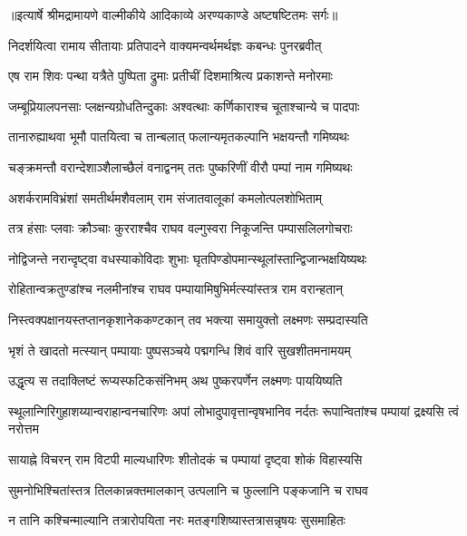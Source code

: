 {॥इत्यार्षे श्रीमद्रामायणे वाल्मीकीये आदिकाव्ये अरण्यकाण्डे अष्टषष्टितमः सर्गः॥}


\twolineshloka
{निदर्शयित्वा रामाय सीतायाः प्रतिपादने}
{वाक्यमन्वर्थमर्थज्ञः कबन्धः पुनरब्रवीत्} %

\twolineshloka
{एष राम शिवः पन्था यत्रैते पुष्पिता द्रुमाः}
{प्रतीचीं दिशमाश्रित्य प्रकाशन्ते मनोरमाः} %

\twolineshloka
{जम्बूप्रियालपनसाः प्लक्षन्यग्रोधतिन्दुकाः}
{अश्वत्थाः कर्णिकाराश्च चूताश्चान्ये च पादपाः} %

\twolineshloka
{तानारुह्याथवा भूमौ पातयित्वा च तान्बलात्}
{फलान्यमृतकल्पानि भक्षयन्तौ गमिष्यथः} %

\twolineshloka
{चङ्क्रमन्तौ वरान्देशाञ्शैलाच्छैलं वनाद्वनम्}
{ततः पुष्करिणीं वीरौ पम्पां नाम गमिष्यथः} %

\twolineshloka
{अशर्करामविभ्रंशां समतीर्थमशैवलाम्}
{राम संजातवालूकां कमलोत्पलशोभिताम्} %

\twolineshloka
{तत्र हंसाः प्लवाः क्रौञ्चाः कुरराश्चैव राघव}
{वल्गुस्वरा निकूजन्ति पम्पासलिलगोचराः} %

\twolineshloka
{नोद्विजन्ते नरान्दृष्ट्वा वधस्याकोविदाः शुभाः}
{घृतपिण्डोपमान्स्थूलांस्तान्द्विजान्भक्षयिष्यथः} %

\twolineshloka
{रोहितान्वक्रतुण्डांश्च नलमीनांश्च राघव}
{पम्पायामिषुभिर्मत्स्यांस्तत्र राम वरान्हतान्} %

\twolineshloka
{निस्त्वक्पक्षानयस्तप्तानकृशानेककण्टकान्}
{तव भक्त्या समायुक्तो लक्ष्मणः सम्प्रदास्यति} %

\twolineshloka
{भृशं ते खादतो मत्स्यान् पम्पायाः पुष्पसञ्चये}
{पद्मगन्धि शिवं वारि सुखशीतमनामयम्} %

\twolineshloka
{उद्धृत्य स तदाक्लिष्टं रूप्यस्फटिकसंनिभम्}
{अथ पुष्करपर्णेन लक्ष्मणः पाययिष्यति} %

\threelineshloka
{स्थूलान्गिरिगुहाशय्यान्वराहान्वनचारिणः}
{अपां लोभादुपावृत्तान्वृषभानिव नर्दतः}
{रूपान्वितांश्च पम्पायां द्रक्ष्यसि त्वं नरोत्तम} %

\twolineshloka
{सायाह्ने विचरन् राम विटपी माल्यधारिणः}
{शीतोदकं च पम्पायां दृष्ट्वा शोकं विहास्यसि} %

\twolineshloka
{सुमनोभिश्चितांस्तत्र तिलकान्नक्तमालकान्}
{उत्पलानि च फुल्लानि पङ्कजानि च राघव} %

\twolineshloka
{न तानि कश्चिन्माल्यानि तत्रारोपयिता नरः}
{मतङ्गशिष्यास्तत्रासन्नृषयः सुसमाहितः} %


